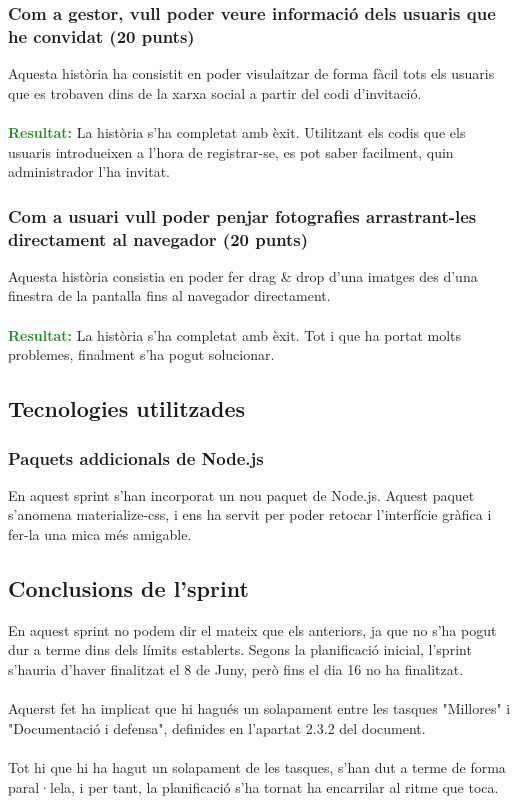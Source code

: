 \documentclass[11pt,catalan,listoffigures,listoftables]{tfgetsinf}
\begin{document}
\subsubsection{Com a gestor, vull poder veure informació dels usuaris que he convidat (20 punts)}

Aquesta història ha consistit en poder visulaitzar de forma fàcil tots els usuaris que es trobaven dins de la xarxa social a partir del codi d'invitació.\\ \\
\textcolor{forestgreen}{\textbf{Resultat:}} La història s'ha completat amb èxit. Utilitzant els codis que els usuaris introdueixen a l'hora de registrar-se, es pot saber facilment, quin administrador l'ha invitat.

\subsubsection{Com a usuari vull poder penjar fotografies arrastrant-les directament al navegador (20 punts)}

Aquesta història consistia en poder fer drag \& drop d'una imatges des d'una finestra de la pantalla fins al navegador directament.\\ \\
\textcolor{forestgreen}{\textbf{Resultat:}} La història s'ha completat amb èxit. Tot i que ha portat molts problemes, finalment s'ha pogut solucionar.

\subsection{Tecnologies utilitzades}

\subsubsection{Paquets addicionals de Node.js}

En aquest sprint s'han incorporat un nou paquet de Node.js. Aquest paquet s'anomena materialize-css, i ens ha servit per poder retocar l'interfície gràfica i fer-la una mica més amigable.

\subsection{Conclusions de l'sprint}

En aquest sprint no podem dir el mateix que els anteriors, ja que no s'ha pogut dur a terme dins dels límits establerts. Segons la planificació inicial, l'sprint s'hauria d'haver finalitzat el 8 de Juny, però fins el dia 16 no ha finalitzat.\\ \\
Aquerst fet ha implicat que hi hagués un solapament entre les tasques "Millores" i "Documentació i defensa", definides en l'apartat 2.3.2 del document.
\\ \\
Tot hi que hi ha hagut un solapament de les tasques, s'han dut a terme de forma paral·lela, i per tant, la planificació s'ha tornat ha encarrilar al ritme que toca.
\end{document}
